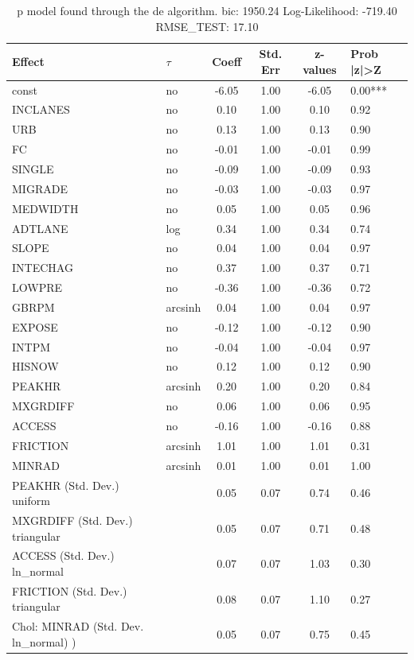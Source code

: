 \begin{table}
	\caption{p model found through the de algorithm. bic: 1950.24 Log-Likelihood: -719.40 RMSE_TEST: 17.10}
	\begin{center}
		\begin{tabular}{|l|l|c|c|c|l|}
			\hline
			Effect & $\tau$ & Coeff & Std. Err & z-values & Prob |z|>Z \\
			\hline
			const & no & -6.05 & 1.00 & -6.05 & 0.00*** \\
			\hline
			INCLANES & no & 0.10 & 1.00 & 0.10 & 0.92 \\
			\hline
			URB & no & 0.13 & 1.00 & 0.13 & 0.90 \\
			\hline
			FC & no & -0.01 & 1.00 & -0.01 & 0.99 \\
			\hline
			SINGLE & no & -0.09 & 1.00 & -0.09 & 0.93 \\
			\hline
			MIGRADE & no & -0.03 & 1.00 & -0.03 & 0.97 \\
			\hline
			MEDWIDTH & no & 0.05 & 1.00 & 0.05 & 0.96 \\
			\hline
			ADTLANE & log & 0.34 & 1.00 & 0.34 & 0.74 \\
			\hline
			SLOPE & no & 0.04 & 1.00 & 0.04 & 0.97 \\
			\hline
			INTECHAG & no & 0.37 & 1.00 & 0.37 & 0.71 \\
			\hline
			LOWPRE & no & -0.36 & 1.00 & -0.36 & 0.72 \\
			\hline
			GBRPM & arcsinh & 0.04 & 1.00 & 0.04 & 0.97 \\
			\hline
			EXPOSE & no & -0.12 & 1.00 & -0.12 & 0.90 \\
			\hline
			INTPM & no & -0.04 & 1.00 & -0.04 & 0.97 \\
			\hline
			HISNOW & no & 0.12 & 1.00 & 0.12 & 0.90 \\
			\hline
			PEAKHR & arcsinh & 0.20 & 1.00 & 0.20 & 0.84 \\
			\hline
			MXGRDIFF & no & 0.06 & 1.00 & 0.06 & 0.95 \\
			\hline
			ACCESS & no & -0.16 & 1.00 & -0.16 & 0.88 \\
			\hline
			FRICTION & arcsinh & 1.01 & 1.00 & 1.01 & 0.31 \\
			\hline
			MINRAD & arcsinh & 0.01 & 1.00 & 0.01 & 1.00 \\
			\hline
			PEAKHR (Std. Dev.) uniform &  & 0.05 & 0.07 & 0.74 & 0.46 \\
			\hline
			MXGRDIFF (Std. Dev.) triangular &  & 0.05 & 0.07 & 0.71 & 0.48 \\
			\hline
			ACCESS (Std. Dev.) ln_normal &  & 0.07 & 0.07 & 1.03 & 0.30 \\
			\hline
			FRICTION (Std. Dev.) triangular &  & 0.08 & 0.07 & 1.10 & 0.27 \\
			\hline
			 Chol: MINRAD (Std. Dev. ln_normal) ) &  & 0.05 & 0.07 & 0.75 & 0.45 \\
			\hline
		\end{tabular}
	\end{center}
\end{table}